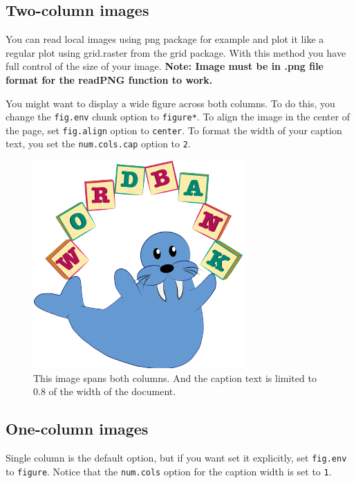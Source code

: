 \documentclass[10pt, letterpaper]{article}
\newenvironment{CodeChunk}{}{}
\begin{document}
\subsection{Two-column images}\label{two-column-images}

You can read local images using png package for example and plot it like
a regular plot using grid.raster from the grid package. With this method
you have full control of the size of your image. \textbf{Note: Image
must be in .png file format for the readPNG function to work.}

You might want to display a wide figure across both columns. To do this,
you change the \texttt{fig.env} chunk option to \texttt{figure*}. To
align the image in the center of the page, set \texttt{fig.align} option
to \texttt{center}. To format the width of your caption text, you set
the \texttt{num.cols.cap} option to \texttt{2}.

\begin{CodeChunk}
\begin{figure}[h]

{\centering \includegraphics{figs/2-col-image-1} 

}

\caption[This image spans both columns]{This image spans both columns. And the caption text is limited to 0.8 of the width of the document.}\label{fig:2-col-image}
\end{figure}
\end{CodeChunk}

\subsection{One-column images}\label{one-column-images}

Single column is the default option, but if you want set it explicitly,
set \texttt{fig.env} to \texttt{figure}. Notice that the
\texttt{num.cols} option for the caption width is set to \texttt{1}.
\end{document}
